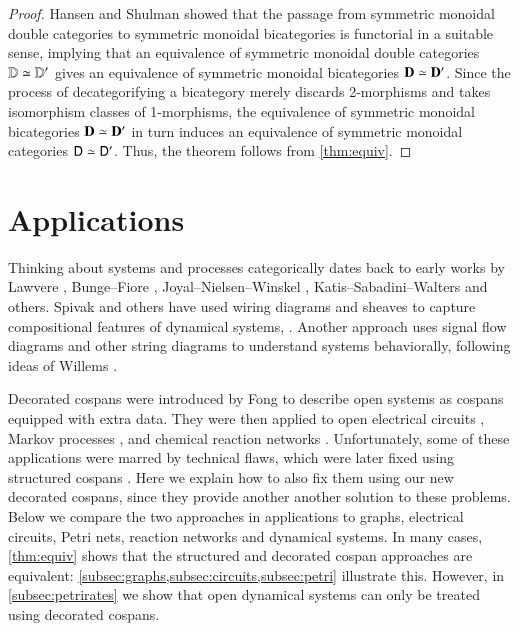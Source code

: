 \documentclass[reqno]{amsart}
\begin{document}
\begin{proof} 
Hansen and Shulman \cite{HS} showed that the passage from symmetric monoidal double categories to symmetric monoidal bicategories is  functorial in a suitable sense, implying that an equivalence of symmetric monoidal double categories $\mathbf{\mathbb D} \simeq \mathbf{\mathbb D}'$ gives an equivalence of symmetric monoidal bicategories $\mathbf{D} \simeq \mathbf{D}'$.    Since the process of decategorifying a bicategory merely discards 2-morphisms and takes isomorphism classes of 1-morphisms, the equivalence of symmetric monoidal bicategories $\mathbf{D} \simeq \mathbf{D}'$ in turn induces an equivalence of symmetric monoidal categories $\mathsf{D} \simeq \mathsf{D}'$.   Thus, the theorem follows from \cref{thm:equiv}. \end{proof}

\section{Applications}\label{Applications}

Thinking about systems and processes categorically dates back to early works by Lawvere \cite{Lawvere}, Bunge--Fiore \cite{BungeFiore}, Joyal--Nielsen--Winskel \cite{JNW}, Katis--Sabadini--Walters \cite{KSW} and others.   Spivak and others have used wiring diagrams and sheaves to capture compositional features of dynamical systems, \cite{BFV,SSV,VSL}.  Another approach uses signal flow diagrams and other string diagrams \cite{BE,BSZ,FRS} to understand systems behaviorally, following ideas of Willems \cite{Willems}.  
 
Decorated cospans were introduced by Fong \cite{Fong,FongThesis} to describe open systems as cospans equipped with extra data.  They were then applied to open electrical circuits \cite{BF}, Markov processes \cite{BFP}, and chemical reaction networks \cite{BP}.  Unfortunately, some of these applications were marred by technical flaws, which were later fixed using structured cospans \cite{BC}. Here we explain how to also fix them using our new decorated cospans, since they provide another another solution to these problems. Below we compare the two approaches in applications to graphs, electrical circuits, Petri nets, reaction networks and dynamical systems. In many cases, \cref{thm:equiv} shows that the structured and decorated cospan approaches are equivalent: \cref{subsec:graphs,subsec:circuits,subsec:petri} illustrate this. However, in \cref{subsec:petrirates} we show that open dynamical systems can only be treated using decorated cospans.
\end{document}
